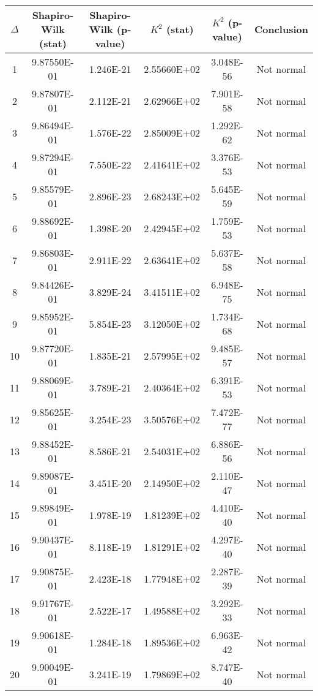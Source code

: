 \begin{table}[h]
	\begin{tabular}{|c|c|c|c|c|c|}
		\hline
		$\Delta$ &  Shapiro-Wilk (stat) & Shapiro-Wilk (p-value) & $K^2$ (stat) & $K^2$ (p-value) & Conclusion\\\hline
		\hline
		1 & 9.87550E-01 & 1.246E-21 & 2.55660E+02 & 3.048E-56 & Not normal\\\hline
		2 & 9.87807E-01 & 2.112E-21 & 2.62966E+02 & 7.901E-58 & Not normal\\\hline
		3 & 9.86494E-01 & 1.576E-22 & 2.85009E+02 & 1.292E-62 & Not normal\\\hline
		4 & 9.87294E-01 & 7.550E-22 & 2.41641E+02 & 3.376E-53 & Not normal\\\hline
		5 & 9.85579E-01 & 2.896E-23 & 2.68243E+02 & 5.645E-59 & Not normal\\\hline
		6 & 9.88692E-01 & 1.398E-20 & 2.42945E+02 & 1.759E-53 & Not normal\\\hline
		7 & 9.86803E-01 & 2.911E-22 & 2.63641E+02 & 5.637E-58 & Not normal\\\hline
		8 & 9.84426E-01 & 3.829E-24 & 3.41511E+02 & 6.948E-75 & Not normal\\\hline
		9 & 9.85952E-01 & 5.854E-23 & 3.12050E+02 & 1.734E-68 & Not normal\\\hline
		10 & 9.87720E-01 & 1.835E-21 & 2.57995E+02 & 9.485E-57 & Not normal\\\hline
		11 & 9.88069E-01 & 3.789E-21 & 2.40364E+02 & 6.391E-53 & Not normal\\\hline
		12 & 9.85625E-01 & 3.254E-23 & 3.50576E+02 & 7.472E-77 & Not normal\\\hline
		13 & 9.88452E-01 & 8.586E-21 & 2.54031E+02 & 6.886E-56 & Not normal\\\hline
		14 & 9.89087E-01 & 3.451E-20 & 2.14950E+02 & 2.110E-47 & Not normal\\\hline
		15 & 9.89849E-01 & 1.978E-19 & 1.81239E+02 & 4.410E-40 & Not normal\\\hline
		16 & 9.90437E-01 & 8.118E-19 & 1.81291E+02 & 4.297E-40 & Not normal\\\hline
		17 & 9.90875E-01 & 2.423E-18 & 1.77948E+02 & 2.287E-39 & Not normal\\\hline
		18 & 9.91767E-01 & 2.522E-17 & 1.49588E+02 & 3.292E-33 & Not normal\\\hline
		19 & 9.90618E-01 & 1.284E-18 & 1.89536E+02 & 6.963E-42 & Not normal\\\hline
		20 & 9.90049E-01 & 3.241E-19 & 1.79869E+02 & 8.747E-40 & Not normal\\\hline

\end{tabular}
\end{table}
